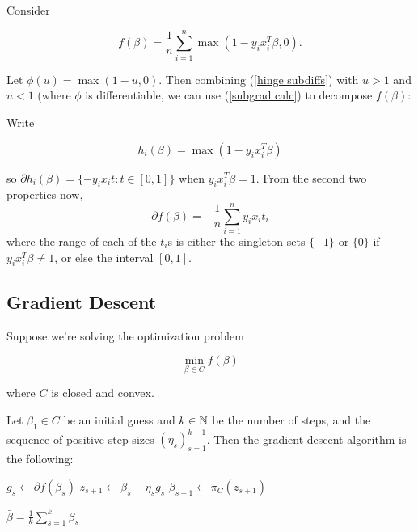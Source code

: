 \documentclass[11pt]{scrartcl}
\begin{document}
\begin{example}
\label{SVM subgs}
Consider %

\begin{equation}
    f(\beta) = \frac1n \sum_{i=1}^n \max(1 - y_i x_i^T \beta, 0).
\end{equation}

Let $\phi(u) = \max(1-u,0)$. Then combining (\ref{hinge subdiffs}) with $u>1$ and $u<1$ (where $\phi$ is differentiable, we can use (\ref{subgrad calc}) to decompose $f(\beta)$:

Write 

\begin{equation}
    h_i(\beta) = \max(1-y_i x_i^T \beta)
\end{equation}

so $\partial h_i(\beta) = \{ -y_i x_i t : t \in [0,1] \}$ when $y_i x_i^T \beta = 1$. From the second two properties now,
\begin{equation}
    \partial f (\beta) = -\frac1n \sum_{i=1}^n y_i x_i t_i
\end{equation}
where the range of each of the $t_i$s is either the singleton sets $\{ -1 \}$ or $\{ 0 \}$ if $y_i x_i^T \beta \neq 1$, or else the interval $[0,1]$.
\end{example}

\subsection{Gradient Descent}

Suppose we're solving the optimization problem

\begin{equation}
    \min_{\beta \in C} f(\beta)
\end{equation}

where $C$ is closed and convex.

Let $\beta_1 \in C$ be an initial guess and $k \in \mathbb N$ be the number of steps, and the sequence of positive step sizes $(\eta_s)_{s=1}^{k-1}$. Then the gradient descent algorithm is the following:

\begin{algorithmic}
    \State $g_s \gets \partial f(\beta_s)$ 
    \State $z_{s+1} \gets \beta_s - \eta_s g_s$
    \State $\beta_{s+1} \gets \pi_C(z_{s+1})$
\EndFor

\Return $\bar{\beta} = \frac{1}{k} \sum_{s=1}^k \beta_s$ 
\label{gradient descent algo}
\end{algorithmic}
\end{document}
